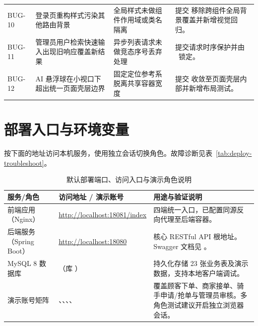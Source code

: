 \begin{longtable}{L{.10\linewidth}L{.25\linewidth}L{.205\linewidth}L{.355\linewidth}}
BUG-10 & 登录页重构样式污染其他路由背景 & 全局样式未做组件作用域或类名隔离 & 提交  移除跨组件全局背景覆盖并新增视觉回归。 \\
BUG-11 & 管理员用户检索快速输入出现旧响应\mbox{覆盖新结果} & 异步列表请求未做竞态序号丢弃处理 & 提交请求时序保护并由 \mbox{ 锁定。} \\
BUG-12 & AI 悬浮球在小视口下超出统一页面壳层边界 & 固定定位参考系脱离共享容器宽度 & 提交  收敛至页面壳层内部并新增布局测试。 \\
\end{longtable}

\endgroup

\section{部署入口与环境变量}
按下面的地址访问本机服务，使用独立会话切换角色。故障诊断见表~\ref{tab:deploy-troubleshoot}。

\begingroup
\renewcommand{\reporttablesize}{\renewcommand{\baselinestretch}{1}\fontsize{10.5bp}{12.3bp}\selectfont\renewcommand{\arraystretch}{1.04}}
\setlength{\LTpre}{3pt}
\setlength{\LTpost}{4pt}

\begin{longtable}{L{.18\linewidth}L{.36\linewidth}L{.40\linewidth}}
\caption{默认部署端口、访问入口与演示角色说明}\label{tab:deploy-endpoints}\\
\toprule
\textbf{服务/角色} & \textbf{访问地址 / 演示账号} & \textbf{用途与验证说明} \\
\midrule
前端应用（Nginx） & \url{http://localhost:18081/index} & 四端统一入口，已配置同源反向代理至后端容器。 \\
后端服务（Spring Boot） & \url{http://localhost:18080} & 核心 RESTful API 根地址。Swagger 文档见 。 \\
MySQL 8 数据库 & （库 ） & 持久化存储 23 张业务表及演示数据，支持本地客户端调试。 \\
演示账号矩阵 & 、、、、 & 覆盖顾客下单、商家接单、骑手申请/抢单与管理员审核。多角色测试建议开启独立浏览器会话。 \\
\bottomrule
\end{longtable}

